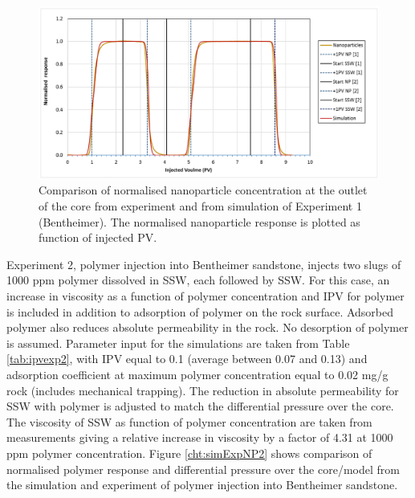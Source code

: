\documentclass[journal = enfuem, manuscript =  article]{achemso}
\begin{document}
\begin{figure}[h]
    \centering
    \includegraphics[width=\textwidth]{fig/simExpNP.png}
    \caption{Comparison of normalised nanoparticle concentration at the outlet of the core from experiment and from simulation of Experiment 1 (Bentheimer). The normalised nanoparticle response is plotted as function of injected PV.}
    \label{cht:simExpNP}
\end{figure}

Experiment 2, polymer injection into Bentheimer sandstone, injects two slugs of 1000 ppm polymer dissolved in SSW, each followed by SSW. For this case, an increase in viscosity as a function of polymer concentration and IPV for polymer is included in addition to adsorption of polymer on the rock surface. Adsorbed polymer also reduces absolute permeability in the rock. No desorption of polymer is assumed. Parameter input for the simulations are taken from Table \ref{tab:ipvexp2}, with IPV equal to 0.1 (average between 0.07 and 0.13) and adsorption coefficient at maximum polymer concentration equal to 0.02 mg/g rock (includes mechanical trapping). The reduction in absolute permeability for SSW with polymer is adjusted to match the differential pressure over the core. The viscosity of SSW as function of polymer concentration are taken from measurements giving a relative increase in viscosity by a factor of 4.31 at 1000 ppm polymer concentration. Figure \ref{cht:simExpNP2} shows comparison of normalised polymer response and differential pressure over the core/model from the simulation and experiment of polymer injection into Bentheimer sandstone.
\end{document}
